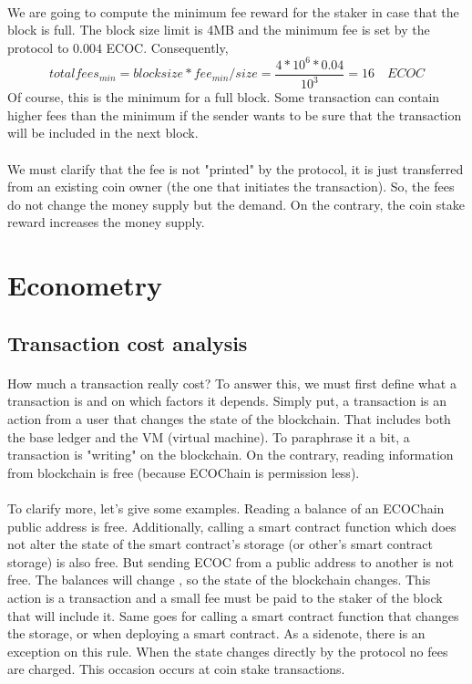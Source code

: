 \documentclass{article}
\begin{document}
\paragraph{}
We are going to compute the minimum fee reward for the staker in case that the block is full. The block size limit is 4MB and the minimum fee is set by the protocol to $0.004$ ECOC. Consequently,
$$ totalfees_{min}=block size * fee_{min} / size = \frac{4*10^6 * 0.04}{10^3}=16 \quad ECOC$$
Of course, this is the minimum for a full block. Some transaction can contain higher fees than the minimum if the sender wants to be sure that the transaction will be included in the next block.

\paragraph{}
We must clarify that the fee is not "printed" by the protocol, it is just transferred from an existing coin owner (the one that initiates the transaction). So, the fees do not change the money supply but the demand. On the contrary, the coin stake reward increases the money supply.

\section{Econometry}
\subsection{Transaction cost analysis}
\paragraph{}
How much a transaction really cost? To answer this, we must first define what a transaction is and on which factors it depends. Simply put, a transaction is an action from a user that changes the state of the blockchain. That includes both the base ledger and the VM (virtual machine). To paraphrase it a bit, a transaction is "writing" on the blockchain. On the contrary, reading information from blockchain is free (because ECOChain is permission less).
\paragraph{}
To clarify more, let's give some examples. Reading a balance of an ECOChain public address is free. Additionally, calling a smart contract function which does not alter the state of the smart contract's storage (or other's smart contract storage) is also free. But sending ECOC from a public address to another is not free. The balances will change , so the state of the blockchain changes. This action is a transaction and a small fee must be paid to the staker of the block that will include it. Same goes for calling a smart contract function that changes the storage, or when deploying a smart contract. As a sidenote, there is an exception on this rule. When the state changes directly by the protocol no fees are charged. This occasion occurs at coin stake transactions.
\end{document}
